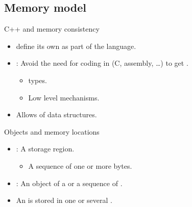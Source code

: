 \subsection{Memory model}

\begin{frame}[t]{C++ and memory consistency}
\begin{itemize}
  \item {} define its own  
        as part of the language.

  \item {}: 
        Avoid the need for coding in
         (C, assembly, \ldots) 
        to get .
    \begin{itemize}
      \item {} types.
      \item Low level  mechanisms.
    \end{itemize}

  \item Allows  of
         data structures.
\end{itemize}
\end{frame}

\begin{frame}[t]{Objects and memory locations}
\begin{itemize}
  \item {}: 
        A storage region.
    \begin{itemize}
      \item A sequence of one or more bytes.
    \end{itemize}

  \item {}: An object of a  
        or a sequence of .

  \item An  is stored in one or several
        .
\end{itemize}
\end{frame}

